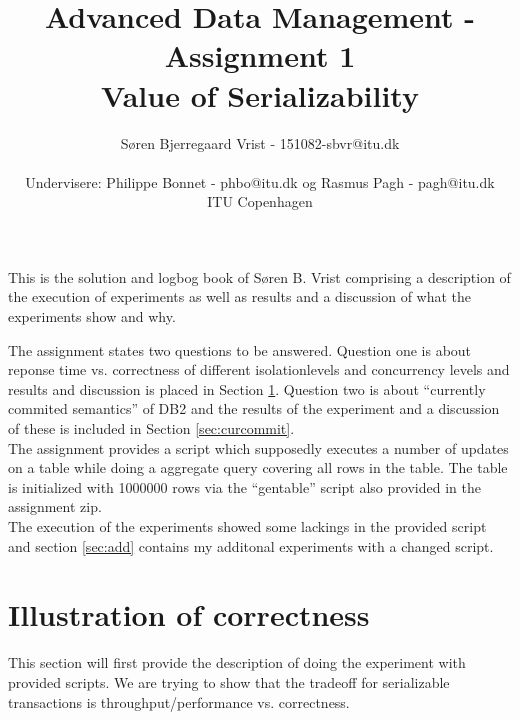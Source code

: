 
\title{Advanced Data Management - Assignment 1\\Value of Serializability}
\author{S\o ren Bjerregaard Vrist - 151082-sbvr@itu.dk\\ \\Undervisere: Philippe Bonnet - phbo@itu.dk og
Rasmus Pagh - pagh@itu.dk\\ITU Copenhagen}


\maketitle
\newpage

This is the solution and logbog book of S\o ren B. Vrist comprising a description of the execution
of experiments as well as results and a discussion of what the experiments show
and why.

The assignment states two questions to be answered. Question one is about
reponse time vs. correctness of different isolationlevels and concurrency
levels and results and discussion is placed in Section \ref{sec:illcorr}.
Question two is about ``currently commited semantics'' of DB2 and the results of
the experiment and a discussion of these is included in Section
\ref{sec:curcommit}.\\

The assignment provides a script which supposedly executes a number of updates
on a table while doing a aggregate query covering all rows in the table. 
The table is initialized with 1000000 rows via the ``gentable'' script also
provided in the assignment zip.\\

The execution of the experiments showed some lackings in the provided script and
section \ref{sec:add} contains my additonal experiments with a changed script.

\chapter{Illustration of correctness}\label{sec:illcorr}
This section will first provide the description of doing the experiment with
provided scripts. We are trying to show that the tradeoff for serializable
transactions is throughput/performance vs. correctness.


